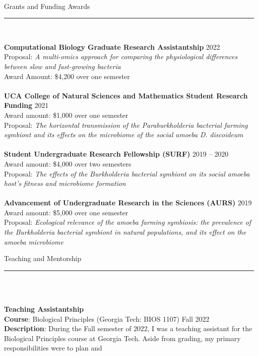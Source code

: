 \documentclass{article}
\begin{document}
\\
\begin{flushleft}
{\Large Grants and Funding Awards} \rule{16.51cm}{0.4pt}\\
\end{flushleft}
\textbf{Computational Biology Graduate Research Assistantship} \hfill 2022\\
Proposal: \emph{A multi-omics approach for comparing the physiological differences between slow and fast-growing bacteria}\\
Award Amount: \$4,200 over one semester\\
\\
\textbf{UCA College of Natural Sciences and Mathematics Student Research Funding} \hfill 2021\\
Award amount: \$1,000 over one semester\\
Proposal: \emph{The horizontal transmission of the Paraburkholderia bacterial farming symbiont and its effects on the microbiome of the social amoeba D. discoideum}\\
\\
\textbf{Student Undergraduate Research Fellowship (SURF)} \hfill 2019 – 2020\\
Award amount: \$4,000 over two semesters\\
Proposal: \emph{The effects of the Burkholderia bacterial symbiont on its social amoeba host’s fitness and microbiome formation}\\
\\
\textbf{Advancement of Undergraduate Research in the Sciences (AURS)} \hfill 2019\\
Award amount: \$5,000 over one semester\\
Proposal: \emph{Ecological relevance of the amoeba farming symbiosis: the prevalence of the Burkholderia bacterial symbiont in natural populations, and its effect on the amoeba microbiome}
\\
\begin{flushleft}
{\Large Teaching and Mentorship} \rule{16.51cm}{0.4pt}\\
\end{flushleft}
\\
\textbf{Teaching Assistantship}\\
\textbf{Course}: Biological Principles (Georgia Tech: BIOS 1107) \hfill Fall 2022\\
\textbf{Description}: During the Fall semester of 2022, I was a teaching assistant for the Biological 
Principles course at Georgia Tech. Aside from grading, my primary responsibilities were to plan and 
\end{document}
